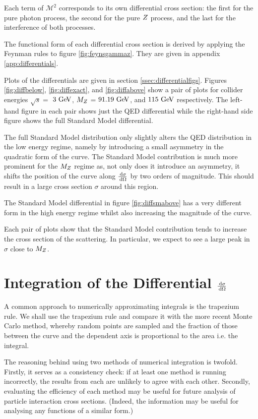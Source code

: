 \documentclass[]{article}
\begin{document}
Each term of $\mathcal{M}^{2}$ corresponds to its own differential cross section: the first for the pure photon process, the second for the pure $Z $ process, and the last for the interference of both processes.

The functional form of each differential cross section is derived by applying the Feynman rules to figure \ref{fig:feynsgammaz}. They are given in appendix \ref{app:differentials}.

Plots of the differentials are given in section \ref{ssec:differentialfigs}. Figures \ref{fig:diffbelow}, \ref{fig:diffexact}, and \ref{fig:diffabove} show a pair of plots for collider energies $\sqrt{s}=$ $3\GeV$, $M_{Z }$ = $91.19\GeV$, and $115\GeV$ respectively. The left-hand figure in each pair shows just the QED differential while the right-hand side figure shows the full Standard Model differential.

The full Standard Model distribution only slightly alters the QED distribution in the low energy regime, namely by introducing a small asymmetry in the quadratic form of the curve. The Standard Model contribution is much more prominent for the $M_{Z }$ regime as, not only does it introduce an asymmetry, it shifts the position of the curve along $\frac{\,\operatorname{d}\!{\sigma}}{\,\operatorname{d}\!{\Omega}}$ by two orders of magnitude. This should result in a large cross section $\sigma$ around this region.

The Standard Model differential in figure \ref{fig:diffsmabove} has a very different form in the high energy regime whilst also increasing the magnitude of the curve.

Each pair of plots show that the Standard Model contribution tends to increase the cross section of the scattering. In particular, we expect to see a large peak in $\sigma$ close to $M_{Z }$.

\section{Integration of the Differential $\frac{\,\operatorname{d}\!{\sigma}}{\,\operatorname{d}\!{\Omega}}$}\label{sec:integration}

A common approach to numerically approximating integrals is the trapezium rule. We shall use the trapezium rule and compare it with the more recent Monte Carlo method, whereby random points are sampled and the fraction of those between the curve and the dependent axis is proportional to the area i.e. the integral.

The reasoning behind using two methods of numerical integration is twofold. Firstly, it serves as a consistency check: if at least one method is running incorrectly, the results from each are unlikely to agree with each other. Secondly, evaluating the efficiency of each method may be useful for future analysis of particle interaction cross sections. (Indeed, the information may be useful for analysing any functions of a similar form.)
\end{document}
